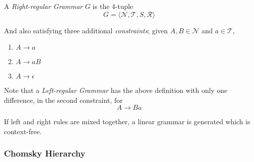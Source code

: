 \begin{definition}
    A \textit{Right-regular Grammar} $G$ is the 4-tuple
    \begin{equation}
        G = \langle
            \mathcal{N},
            \mathcal{T},
            S,
            \mathcal{R}
        \rangle
    \end{equation}
    
    And also satisfying three additional \textit{constraints}; given $A, B \in \mathcal{N}$ and $a \in \mathcal{T}$,
    \begin{enumerate}
        \item $A \to a$
        \item $A \to aB$
        \item $A \to \epsilon$
    \end{enumerate}
\end{definition}

\begin{remark}
    Note that a \textit{Left-regular Grammar} has the above definition with only one difference, in the second constraint, for
    \begin{equation}
        A \to Ba
    \end{equation}

    If left and right rules are mixed together, a linear grammar is generated which is context-free.
\end{remark}

\subsubsection{Chomsky Hierarchy}

